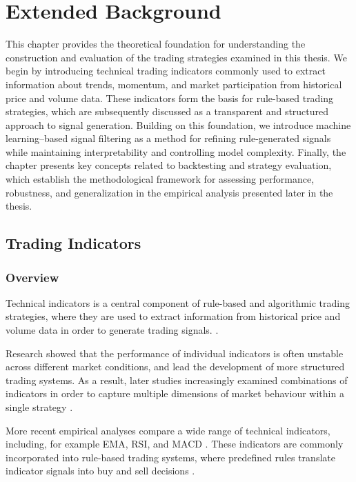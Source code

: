 \chapter{Extended Background}
\label{chapter:Background}

This chapter provides the theoretical foundation for understanding the construction and evaluation of the trading strategies examined in this thesis. We begin by introducing technical trading indicators commonly used to extract information about trends, momentum, and market participation from historical price and volume data. These indicators form the basis for rule-based trading strategies, which are subsequently discussed as a transparent and structured approach to signal generation. Building on this foundation, we introduce machine learning–based signal filtering as a method for refining rule-generated signals while maintaining interpretability and controlling model complexity. Finally, the chapter presents key concepts related to backtesting and strategy evaluation, which establish the methodological framework for assessing performance, robustness, and generalization in the empirical analysis presented later in the thesis.

\section{Trading Indicators}

\subsection{Overview}

Technical indicators is a central component of rule-based and
algorithmic trading strategies, where they are used to extract information
from historical price and volume data in order to generate trading signals. \citep{curcio1997technical}.

Research showed that the performance of individual indicators is
often unstable across different market conditions, and lead the development
of more structured trading systems. As a result, later studies increasingly examined combinations of indicators in
order to capture multiple dimensions of market behaviour within a single
strategy
\citep{lento2007profitability}.

More recent empirical analyses compare a wide range of technical indicators,
including, for example EMA, RSI, and MACD
\citep{keshavarz2022trading}.
These indicators are commonly incorporated into rule-based trading systems,
where predefined rules translate indicator signals into buy and sell decisions
\citep{salkar2021algorithmic}.

